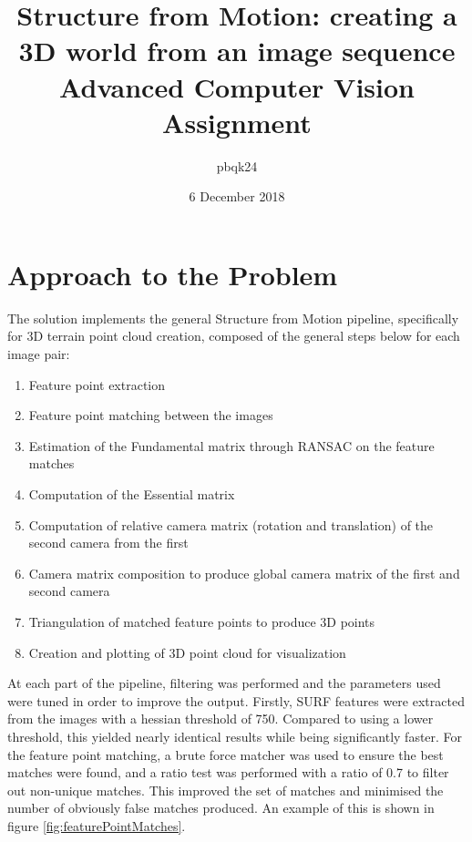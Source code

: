 \documentclass[11pt]{article}
\title{\vspace{-6.0ex}Structure from Motion: creating a 3D world from an image sequence\\\vspace{1.0ex}\large Advanced Computer Vision Assignment}
\author{pbqk24}
\date{6 December 2018}
\begin{document}
	\maketitle
	
\section*{Approach to the Problem}
The solution implements the general Structure from Motion pipeline, specifically for 3D terrain point cloud creation, composed of the general steps below for each image pair:
\begin{enumerate}
	\item Feature point extraction
	\item Feature point matching between the images
	\item Estimation of the Fundamental matrix through RANSAC on the feature matches
	\item Computation of the Essential matrix
	\item Computation of relative camera matrix (rotation and translation) of the second camera from the first
	\item Camera matrix composition to produce global camera matrix of the first and second camera
	\item Triangulation of matched feature points to produce 3D points
	\item Creation and plotting of 3D point cloud for visualization
\end{enumerate}

At each part of the pipeline, filtering was performed and the parameters used were tuned in order to improve the output. Firstly, SURF features were extracted from the images with a hessian threshold of 750. Compared to using a lower threshold, this yielded nearly identical results while being significantly faster. For the feature point matching, a brute force matcher was used to ensure the best matches were found, and a ratio test was performed with a ratio of 0.7 to filter out non-unique matches. This improved the set of matches and minimised the number of obviously false matches produced. An example of this is shown in figure \ref{fig:featurePointMatches}.
\end{document}
